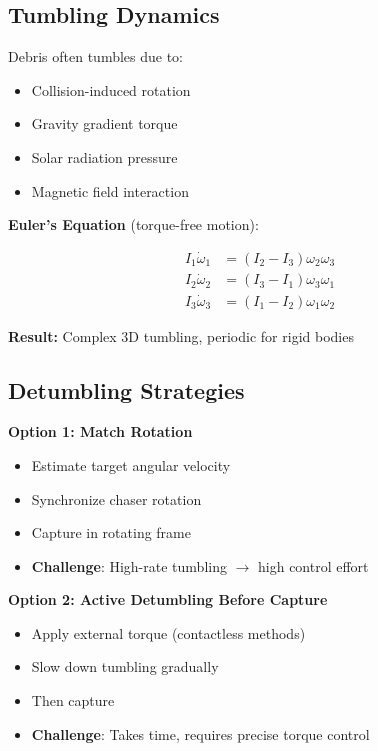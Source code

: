 \documentclass[11pt,a4paper]{article}
\begin{document}
\subsection{Tumbling Dynamics}

Debris often tumbles due to:
\begin{itemize}[leftmargin=*]
    \item Collision-induced rotation
    \item Gravity gradient torque
    \item Solar radiation pressure
    \item Magnetic field interaction
\end{itemize}

\textbf{Euler's Equation} (torque-free motion):

\begin{align}
I_1\dot{\omega}_1 &= (I_2 - I_3)\omega_2\omega_3 \\
I_2\dot{\omega}_2 &= (I_3 - I_1)\omega_3\omega_1 \\
I_3\dot{\omega}_3 &= (I_1 - I_2)\omega_1\omega_2
\end{align}

\textbf{Result:} Complex 3D tumbling, periodic for rigid bodies

\subsection{Detumbling Strategies}

\textbf{Option 1: Match Rotation}
\begin{itemize}[leftmargin=*]
    \item Estimate target angular velocity
    \item Synchronize chaser rotation
    \item Capture in rotating frame
    \item \textbf{Challenge}: High-rate tumbling $\rightarrow$ high control effort
\end{itemize}

\textbf{Option 2: Active Detumbling Before Capture}
\begin{itemize}[leftmargin=*]
    \item Apply external torque (contactless methods)
    \item Slow down tumbling gradually
    \item Then capture
    \item \textbf{Challenge}: Takes time, requires precise torque control
\end{itemize}
\end{document}
